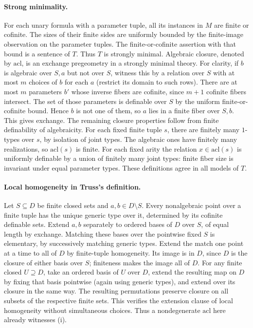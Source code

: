 \documentclass[11pt]{article}
\begin{document}
\paragraph{Strong minimality.} For each unary formula with a parameter tuple, all its instances in $M$ are finite or cofinite. The sizes of their finite sides are uniformly bounded by the finite-image observation on the parameter tuples. The finite-or-cofinite assertion with that bound is a sentence of $T$. Thus $T$ is strongly minimal. Algebraic closure, denoted by $\mathrm{acl}$, is an exchange pregeometry in a strongly minimal theory. For clarity, if $b$ is algebraic over $S,a$ but not over $S$, witness this by a relation over $S$ with at most $m$ choices of $b$ for each $a$ (restrict its domain to such rows). There are at most $m$ parameters $b'$ whose inverse fibers are cofinite, since $m+1$ cofinite fibers intersect. The set of those parameters is definable over $S$ by the uniform finite-or-cofinite bound. Hence $b$ is not one of them, so $a$ lies in a finite fiber over $S,b$. This gives exchange. The remaining closure properties follow from finite definability of algebraicity.
For each fixed finite tuple $s$, there are finitely many $1$-types over $s$, by isolation of joint types. The algebraic ones have finitely many realizations, so $\mathrm{acl}(s)$ is finite. For each fixed arity the relation $x\in\mathrm{acl}(s)$ is uniformly definable by a union of finitely many joint types: finite fiber size is invariant under equal parameter types. These definitions agree in all models of $T$.
\paragraph{Local homogeneity in Truss's definition.} Let $S\subseteq D$ be finite closed sets and $a,b\in D\setminus S$. Every nonalgebraic point over a finite tuple has the unique generic type over it, determined by its cofinite definable sets. Extend $a,b$ separately to ordered bases of $D$ over $S$, of equal length by exchange. Matching these bases over the pointwise fixed $S$ is elementary, by successively matching generic types. Extend the match one point at a time to all of $D$ by finite-tuple homogeneity. Its image is in $D$, since $D$ is the closure of either basis over $S$; finiteness makes the image all of $D$. For any finite closed $U\supseteq D$, take an ordered basis of $U$ over $D$, extend the resulting map on $D$ by fixing that basis pointwise (again using generic types), and extend over its closure in the same way. The resulting permutations preserve closure on all subsets of the respective finite sets. This verifies the extension clause of local homogeneity without simultaneous choices. Thus a nondegenerate $\mathrm{acl}$ here already witnesses (i).
\end{document}
